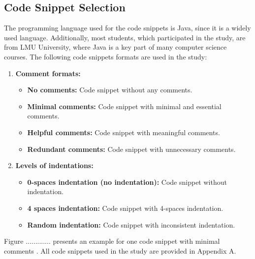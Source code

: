 \subsection{Code Snippet Selection}

The programming language used for the code snippets is Java, since it is a widely used language.  Additionally, most students, which participated in the study, are from LMU University, where Java is a key part of many computer science courses. The following code snippets formats are used in the study:



\begin{enumerate}
    \item \textbf{Comment formats:}
    \begin{itemize}
        \item \textbf{No comments:} Code snippet without any comments.
        \item \textbf{Minimal comments:} Code snippet with minimal and essential comments.
        \item \textbf{Helpful comments:} Code snippet with meaningful comments.
        \item \textbf{Redundant comments:} Code snippet with unnecessary comments.
    \end{itemize}
    
    \item \textbf{Levels of indentations:}
    \begin{itemize}
        \item \textbf{0-spaces indentation (no indentation):} Code snippet without indentation.
        \item \textbf{4 spaces indentation:} Code snippet with 4-spaces indentation.
        \item \textbf{Random indentation:} Code snippet with inconsistent indentation.
    \end{itemize}
\end{enumerate}

Figure .............  presents an example for one code snippet with minimal comments . All code snippets used in the study are provided in Appendix A.


